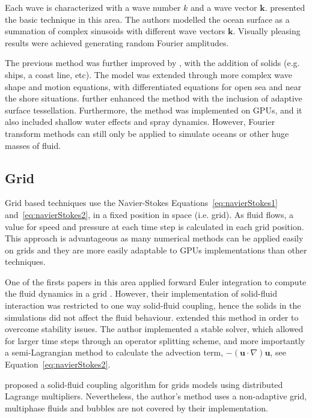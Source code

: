 Each wave is characterized with a wave number $k$ and a wave vector $\mathbf{k}$.
\cite{Tessendorf2001} presented the basic technique in this area.
The authors modelled the ocean surface as a summation of complex sinusoids with different wave vectors $\mathbf{k}$.
Visually pleasing results were achieved generating random Fourier amplitudes.

The previous method was further improved by \cite{Cieutat2003}, with the addition of solids (e.g. ships, a coast line, etc).
The model was extended through more complex wave shape and motion equations, with differentiated equations for open sea and near the shore situations.
\cite{Chiu2006} further enhanced the method with the inclusion of adaptive surface tessellation.
Furthermore, the method was implemented on GPUs, and it also included shallow water effects and spray dynamics.
However, Fourier transform methods can still only be applied to simulate oceans or other huge masses of fluid. 

\subsection{Grid}
\label{gridFluidSolvers}

Grid based techniques use the Navier-Stokes Equations~\ref{eq:navierStokes1} and~\ref{eq:navierStokes2}, in a fixed position in space (i.e. grid).
As fluid flows, a value for speed and pressure at each time step is calculated in each grid position.
This approach is advantageous as many numerical methods can be applied easily on grids and they are more easily adaptable to GPUs implementations than other techniques.

One of the firsts papers in this area applied forward Euler integration to compute the fluid dynamics in a grid \cite{Foster1996}.
However, their implementation of solid-fluid interaction was restricted to one way solid-fluid coupling, hence the solids in the simulations did not affect the fluid behaviour.
\cite{Stam1999} extended this method in order to overcome stability issues.
The author implemented a stable solver, which allowed for larger time steps through an operator splitting scheme, and more importantly a semi-Lagrangian method to calculate the advection term, $-(\mathbf{u} \cdot \nabla ) \mathbf{u}$, see Equation~\ref{eq:navierStokes2}.

\cite{Carlson2004} proposed a solid-fluid coupling algorithm for grids models using distributed Lagrange multipliers.
Nevertheless, the author's method uses a non-adaptive grid, multiphase fluids and bubbles are not covered by their implementation.

